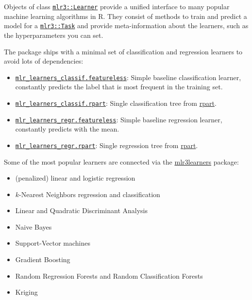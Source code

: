 \documentclass[]{article}
\providecommand{\tightlist}{%
  \setlength{\itemsep}{0pt}\setlength{\parskip}{0pt}}
\begin{document}
Objects of class \href{https://mlr3.mlr-org.com/reference/Learner.html}{\texttt{mlr3::Learner}} provide a unified interface to many popular machine learning algorithms in R.
They consist of methods to train and predict a model for a \href{https://mlr3.mlr-org.com/reference/Task.html}{\texttt{mlr3::Task}} and provide meta-information about the learners, such as the hyperparameters you can set.

The package ships with a minimal set of classification and regression learners to avoid lots of dependencies:

\begin{itemize}
\tightlist
\item
  \href{https://mlr3.mlr-org.com/reference/mlr_learners_classif.featureless.html}{\texttt{mlr\_learners\_classif.featureless}}: Simple baseline classification learner, constantly predicts the label that is most frequent in the training set.
\item
  \href{https://mlr3.mlr-org.com/reference/mlr_learners_classif.rpart.html}{\texttt{mlr\_learners\_classif.rpart}}: Single classification tree from \href{https://cran.r-project.org/package=rpart}{rpart}.
\item
  \href{https://mlr3.mlr-org.com/reference/mlr_learners_regr.featureless.html}{\texttt{mlr\_learners\_regr.featureless}}: Simple baseline regression learner, constantly predicts with the mean.
\item
  \href{https://mlr3.mlr-org.com/reference/mlr_learners_regr.rpart.html}{\texttt{mlr\_learners\_regr.rpart}}: Single regression tree from \href{https://cran.r-project.org/package=rpart}{rpart}.
\end{itemize}

Some of the most popular learners are connected via the \href{https://mlr3learners.mlr-org.com}{mlr3learners} package:

\begin{itemize}
\tightlist
\item
  (penalized) linear and logistic regression
\item
  \(k\)-Nearest Neighbors regression and classification
\item
  Linear and Quadratic Discriminant Analysis
\item
  Naive Bayes
\item
  Support-Vector machines
\item
  Gradient Boosting
\item
  Random Regression Forests and Random Classification Forests
\item
  Kriging
\end{itemize}
\end{document}
